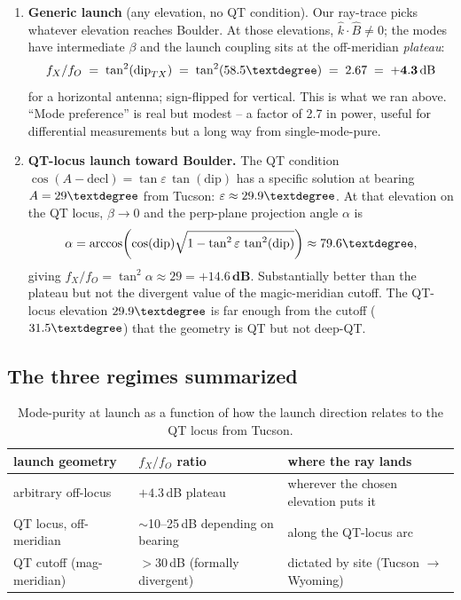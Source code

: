 \documentclass[11pt]{article}
\begin{document}
\begin{enumerate}
\item \textbf{Generic launch} (any elevation, no QT condition).  Our
ray-trace picks whatever elevation reaches Boulder.  At those
elevations, $\hat k\cdot\hat B \neq 0$; the modes have intermediate
$\beta$ and the launch coupling sits at the off-meridian
\emph{plateau}:
\[
   f_X / f_O \;=\; \tan^2(\mathrm{dip}_{TX}) \;=\; \tan^2(58.5\textdegree)
       \;=\; 2.67 \;=\; \mathbf{+4.3\,\text{dB}}
\]
for a horizontal antenna; sign-flipped for vertical.  This is what
we ran above.  ``Mode preference'' is real but modest -- a factor of
2.7 in power, useful for differential measurements but a long way
from single-mode-pure.

\item \textbf{QT-locus launch toward Boulder.}  The QT condition
$\cos(A-\mathrm{decl})=\tan\varepsilon\,\tan(\mathrm{dip})$ has a
specific solution at bearing $A=29\textdegree$ from Tucson:
$\varepsilon\approx 29.9\textdegree$.  At that elevation on the QT
locus, $\beta\to 0$ and the perp-plane projection angle $\alpha$ is
\[
   \alpha = \arccos\!\left(\cos(\mathrm{dip})\sqrt{1-\tan^2\varepsilon\,\tan^2(\mathrm{dip})}\right)
   \approx 79.6\textdegree,
\]
giving $f_X/f_O = \tan^2\alpha \approx 29 = \mathbf{+14.6\,\text{dB}}$.
Substantially better than the plateau but not the divergent value
of the magic-meridian cutoff.  The QT-locus elevation
$29.9\textdegree$ is far enough from the cutoff
($31.5\textdegree$) that the geometry is QT but not deep-QT.
\end{enumerate}

\subsection*{The three regimes summarized}

\begin{table}[H]
\centering
\caption{Mode-purity at launch as a function of how the launch
direction relates to the QT locus from Tucson.}
\begin{tabular}{lll}
\toprule
launch geometry & $f_X/f_O$ ratio & where the ray lands \\
\midrule
arbitrary off-locus  & $+4.3$\,dB plateau & wherever the chosen elevation puts it \\
QT locus, off-meridian & $\sim$10--25\,dB depending on bearing & along the QT-locus arc \\
QT cutoff (mag-meridian) & $>30$\,dB (formally divergent) & dictated by site (Tucson $\to$ Wyoming) \\
\bottomrule
\end{tabular}
\end{table}
\end{document}
